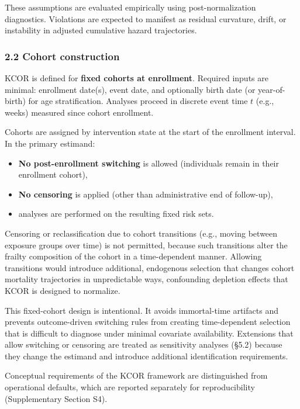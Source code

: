 \documentclass[
]{article}
\providecommand{\tightlist}{%
  \setlength{\itemsep}{0pt}\setlength{\parskip}{0pt}}
\begin{document}
These assumptions are evaluated empirically using post-normalization
diagnostics. Violations are expected to manifest as residual curvature,
drift, or instability in adjusted cumulative hazard trajectories.

\subsubsection{2.2 Cohort construction}\label{cohort-construction}

KCOR is defined for \textbf{fixed cohorts at enrollment}. Required
inputs are minimal: enrollment date(s), event date, and optionally birth
date (or year-of-birth) for age stratification. Analyses proceed in
discrete event time \(t\) (e.g., weeks) measured since cohort
enrollment.

Cohorts are assigned by intervention state at the start of the
enrollment interval. In the primary estimand:

\begin{itemize}
\tightlist
\item
  \textbf{No post-enrollment switching} is allowed (individuals remain
  in their enrollment cohort),
\item
  \textbf{No censoring} is applied (other than administrative end of
  follow-up),
\item
  analyses are performed on the resulting fixed risk sets.
\end{itemize}

Censoring or reclassification due to cohort transitions (e.g., moving
between exposure groups over time) is not permitted, because such
transitions alter the frailty composition of the cohort in a
time-dependent manner. Allowing transitions would introduce additional,
endogenous selection that changes cohort mortality trajectories in
unpredictable ways, confounding depletion effects that KCOR is designed
to normalize.

This fixed-cohort design is intentional. It avoids immortal-time
artifacts and prevents outcome-driven switching rules from creating
time-dependent selection that is difficult to diagnose under minimal
covariate availability. Extensions that allow switching or censoring are
treated as sensitivity analyses (§5.2) because they change the estimand
and introduce additional identification requirements.

Conceptual requirements of the KCOR framework are distinguished from
operational defaults, which are reported separately for reproducibility
(Supplementary Section S4).
\end{document}
